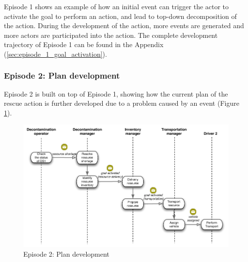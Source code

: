 Episode 1 shows an example of how an initial event can trigger the actor to activate the goal to perform an action, and lead to top-down decomposition of the action. During the development of the action, more events are generated and more actors are participated into the action. The complete development trajectory of Episode 1 can be found in the Appendix (\ref{sec:episode_1_goal_activation}).

\subsubsection{Episode 2: Plan development} %
\label{ssub:episode_2_plan_development}
Episode 2 is built on top of Episode 1, showing how the current plan of the rescue action is further developed due to a problem caused by an event (Figure \ref{fig:episode_2_interaction}). 

\begin{figure}[htbp] %
   \centering
   \includegraphics{episode_2_interaction.pdf} 
   \caption{Episode 2: Plan development}
   \label{fig:episode_2_interaction}
\end{figure}

